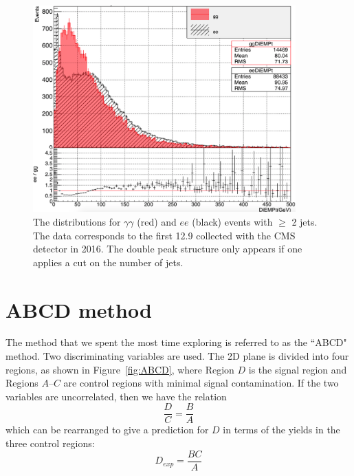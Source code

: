 \begin{figure}[h]
\begin{center}
\includegraphics[width=0.9\textwidth]{Figures/Appendix/weirdDiempt.png}
\end{center}
\caption[The \diempt distributions for $\gamma\gamma$ and $ee$
events with $\geq$ 2 jets.]
{The \diempt distributions for $\gamma\gamma$ (red) and $ee$ (black)
events with $\geq$ 2 jets. The data corresponds to the first 12.9 \fbinv collected 
with the CMS detector in 2016. The double peak structure only appears if one 
applies a cut on the number of jets. }
\label{fig:weirdDiempt}
\end{figure}

\section{ABCD method}
The method that we spent the most time exploring is referred to as the ``ABCD" method.
Two discriminating variables are used. The 2D plane is divided into four regions,
as shown in Figure~\ref{fig:ABCD}, where Region $D$ is the signal region and 
Regions $A$--$C$ are control regions with minimal signal contamination.
If the two variables are uncorrelated, then we have the relation
\begin{equation}
\frac{D}{C} = \frac{B}{A}
\end{equation}
which can be rearranged to give a prediction for $D$ in terms of the yields 
in the three control regions:
\begin{equation}
D_{exp}= \frac{BC}{A}
\end{equation}

